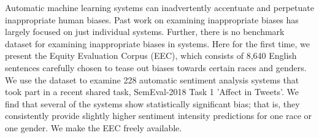 Automatic machine learning systems can inadvertently accentuate and perpetuate inappropriate human biases. Past work on examining inappropriate biases has largely focused on just individual systems. Further, there is no benchmark dataset for examining inappropriate biases in systems. Here for the first time, we present the Equity Evaluation Corpus (EEC), which consists of 8,640 English sentences carefully chosen to tease out biases towards certain races and genders. We use the dataset to examine 228 automatic sentiment analysis systems that took part in a recent shared task, SemEval-2018 Task 1 'Affect in Tweets'. We find that several of the systems show statistically significant bias; that is, they consistently provide slightly higher sentiment intensity predictions for one race or one gender. We make the EEC freely available.
